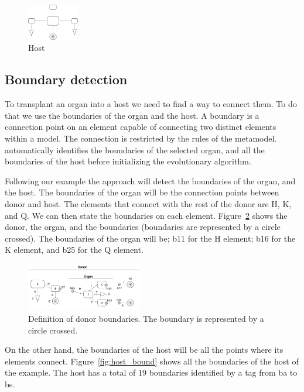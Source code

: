 \begin{figure}[h]
    \centering
    \includegraphics[width=0.2\textwidth]{Figures/host.png}
    \caption{Host}
    \label{fig:host}
\end{figure}

\subsection{Boundary detection}

To transplant an organ into a host we need to find a way to connect them. To do that we use the boundaries of the organ and the host. A boundary is a connection point on an element capable of connecting two distinct elements within a model. The connection is restricted by the rules of the metamodel. \ApproachName{} automatically identifies the boundaries of the selected organ, and all the boundaries of the host before initializing the evolutionary algorithm.

Following our example the approach will detect the boundaries of the organ, and the host. The boundaries of the organ will be the connection points between donor and host. The elements that connect with the rest of the donor are H, K, and Q. We can then state the boundaries on each element. Figure~\ref{fig:org_bound} shows the donor, the organ, and the boundaries (boundaries are represented by a circle crossed). The boundaries of the organ will be; b11 for the H element; b16 for the K element, and b25 for the Q element.

\begin{figure}[h]
    \centering
    \includegraphics[width=0.45\textwidth]{Figures/donor+organ_boundaries.png}
    \caption{Definition of donor boundaries. The boundary is represented by a circle crossed.}
    \label{fig:org_bound}
\end{figure}

On the other hand, the boundaries of the host will be all the points where its elements connect. Figure~\ref{fig:host_bound} shows all the boundaries of the host of the example. The host has a total of 19 boundaries identified by a tag from ba to bs.

